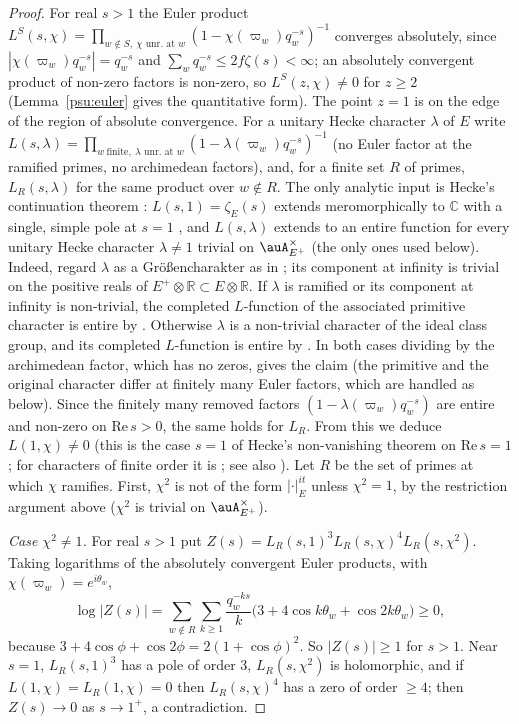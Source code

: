 \documentclass[10pt]{amsart}
\theoremstyle{definition}
\theoremstyle{remark}
\newcommand{\C}{\mathbb C}
\newcommand{\R}{\mathbb R}
\begin{document}
\begin{proof}
For real $s>1$ the Euler product $L^S(s,\chi)=\prod_{w\notin S,\ \chi\text{ unr.\ at }w}(1-\chi
(\varpi_w)q_w^{-s})^{-1}$ converges absolutely, since $|\chi(\varpi_w)q_w^{-s}|=q_w^{-s}$ and
$\sum_wq_w^{-s}\le2f\zeta(s)<\infty$; an absolutely convergent product of non-zero factors is
non-zero, so $L^S(z,\chi)\ne0$ for $z\ge2$ (Lemma~\ref{psu:euler} gives the quantitative form).
The point $z=1$ is on the edge of the region of absolute convergence. For a unitary Hecke character
$\lambda$ of $E$ write $L(s,\lambda)=\prod_{w\ \text{finite},\ \lambda\text{ unr.\ at }w}(1-\lambda
(\varpi_w)q_w^{-s})^{-1}$ (no Euler factor at the ramified primes, no archimedean factors), and, for a
finite set $R$ of primes, $L_R(s,\lambda)$ for the same product over $w\notin R$. The only analytic input
is Hecke's continuation theorem \cite{Hecke1920}: $L(s,1)=\zeta_E(s)$ extends meromorphically
to $\C$ with a single, simple pole at $s=1$ \cite[Chapter~VII, Corollary~(5.11)]{Neukirch}, and $L(s,\lambda)$
extends to an entire function for every unitary Hecke character $\lambda\ne1$ trivial on
$\auA_{E^+}^\times$ (the only ones used below). Indeed, regard $\lambda$ as a Gr\"o{\ss}encharakter as in
\cite[Chapter~VII, \S6]{Neukirch}; its component at infinity is trivial on the positive reals of
$E^+\otimes\R\subset E\otimes\R$. If $\lambda$ is ramified or its component at infinity is non-trivial, the
completed $L$-function of the associated primitive character is entire by \cite[Chapter~VII,
Theorem~(8.5)]{Neukirch}. Otherwise $\lambda$ is a non-trivial character of the ideal class group, and its
completed $L$-function is entire by \cite[Chapter~VII, the remark after Corollary~(5.10)]{Neukirch}. In both
cases dividing by the archimedean factor, which has no zeros, gives the claim (the primitive and the
original character differ at finitely many Euler factors, which are handled as below). Since the finitely many removed factors
$(1-\lambda(\varpi_w)q_w^{-s})$ are entire and non-zero on $\mathrm{Re}\,s>0$, the same holds for
$L_R$. From this we deduce $L(1,\chi)\ne0$ (this is the case $s=1$ of Hecke's non-vanishing theorem on
$\mathrm{Re}\,s=1$; for characters of finite order it is \cite[Chapter~VII, Lemma~(13.3)]{Neukirch}; see also \cite[Theorem~2.4]{FiteSatoTate}). Let $R$ be the set of
primes at which $\chi$ ramifies. First, $\chi^2$ is not of the form $|\cdot|_E^{it}$ unless $\chi^2=1$, by
the restriction argument above ($\chi^2$ is trivial on $\auA_{E^+}^\times$).

\emph{Case $\chi^2\ne1$.} For real $s>1$ put $Z(s)=L_R(s,1)^3L_R(s,\chi)^4L_R(s,\chi^2)$. Taking
logarithms of the absolutely convergent Euler products, with $\chi(\varpi_w)=e^{i\theta_w}$,
\[
\log|Z(s)|=\sum_{w\notin R}\sum_{k\ge1}\frac{q_w^{-ks}}{k}\bigl(3+4\cos k\theta_w+\cos2k\theta_w\bigr)\ge0,
\]
because $3+4\cos\phi+\cos2\phi=2(1+\cos\phi)^2$. So $|Z(s)|\ge1$ for $s>1$. Near $s=1$, $L_R(s,1)^3$
has a pole of order $3$, $L_R(s,\chi^2)$ is holomorphic, and if $L(1,\chi)=L_R(1,\chi)=0$ then
$L_R(s,\chi)^4$ has a zero of order $\ge4$; then $Z(s)\to0$ as $s\to1^+$, a contradiction.


\end{proof}
\end{document}
